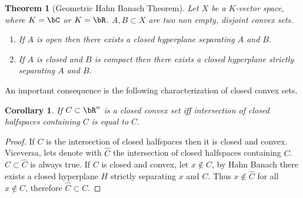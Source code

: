 \documentclass[11pt,a4paper,oneside,openany]{book}
\newtheorem{theorem}{Theorem}
\newtheorem{corollary}{Corollary}[theorem]
\numberwithin{definition}{section}
\numberwithin{theorem}{section}
\numberwithin{problem}{section}
\begin{document}
\begin{theorem}[Geometric Hahn Banach Theorem]\label{Geometric Hahn Banach Theorem}
    Let $X$ be a $K$-vector space, where $K = \bC$ or $K = \bR$.  $A,B \subset X$ are two non empty, disjoint convex sets.
    \begin{enumerate}
        \item If $A$ is open then there exists a closed hyperplane separating $A$ and $B$.
        \item If $A$ is closed and $B$ is compact then there exists a closed hyperplane strictly separating $A$ and $B$.
    \end{enumerate}
\end{theorem}
An important consequence is the following characterization of closed convex sets.
\begin{corollary}
    If $C \subset \bR^{n}$ is a closed convex set iff intersection of closed halfspaces containing $C$ is equal to $C$.
\end{corollary}
\begin{proof}
    If $C$ is the intersection of closed halfspaces then it is closed and convex.
    Viceversa, lets denote with $\hat C$ the intersection of closed halfspaces containing $C$. $C \subset \hat C$ is always true. If $C$ is closed and convex, let $x \notin C$, by Hahn Banach there exists a closed hyperplane $H$ strictly separating $x$ and $C$. Thus $x \notin \hat C$ for all $x \notin C$, therefore $\hat C \subset C$.
\end{proof}
\end{document}
